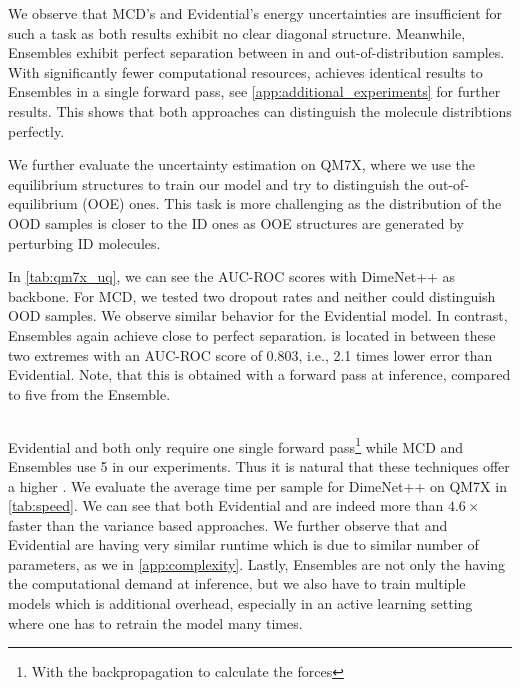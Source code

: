 We observe that MCD's and Evidential's energy uncertainties are insufficient for such a task as both results exhibit no clear diagonal structure. Meanwhile, Ensembles exhibit perfect separation between in and out-of-distribution samples. With significantly fewer computational resources, \oursacro{} achieves identical results to Ensembles in a single forward pass, see \autoref{app:additional_experiments} for further results. This shows that both approaches can distinguish the molecule distribtions perfectly. 

We further evaluate the uncertainty estimation on QM7X, where we use the equilibrium structures to train our model and try to distinguish the out-of-equilibrium (OOE) ones. This task is more challenging as the distribution of the OOD samples is closer to the ID ones as OOE structures are generated by perturbing ID molecules. 

In \autoref{tab:qm7x_uq}, we can see the AUC-ROC scores with DimeNet++ as backbone. For MCD, we tested two dropout rates and neither could distinguish OOD samples. We observe similar behavior for the Evidential model.
In contrast, Ensembles again achieve close to perfect separation.
\oursacro{} is located in between these two extremes with an AUC-ROC score of 0.803, i.e., 2.1 times lower error than Evidential. Note, that this is obtained with a forward pass at inference, compared to five from the Ensemble. 
\begin{table}
    \centering
    \caption{OOD detection on QM7X based on the energy prediction with DimeNet$++$ backbone.}
    \vspace{0.05in}
    \resizebox{\columnwidth}{!}{
    
    }
    \label{tab:qm7x_uq}
\end{table}
\subsection{\desseven{}}
Evidential and \oursacro{} both only require one single forward pass\footnote{With the backpropagation to calculate the forces} while MCD and Ensembles use 5 in our experiments. Thus it is natural that these techniques offer a higher \desseven{}. We evaluate the average time per sample for DimeNet++ on QM7X in \autoref{tab:speed}. We can see that both Evidential and \oursacro{} are indeed  more than $4.6\times$ faster than the variance based approaches. We further observe that \oursacro{} and Evidential are having very similar runtime which is due to similar number of parameters, as we in \cref{app:complexity}. Lastly, Ensembles are not only the having the computational demand at inference, but we also have to train multiple models which is additional overhead, especially in an active learning setting where one has to retrain the model many times.
\begin{table}
    \centering
    \caption{Inference runtime in $\si\ms$ on QM7X data for each UE method.}
    \vspace{0.05in}
    \resizebox{\columnwidth}{!}{
    
    }
    \label{tab:speed}
\end{table}
